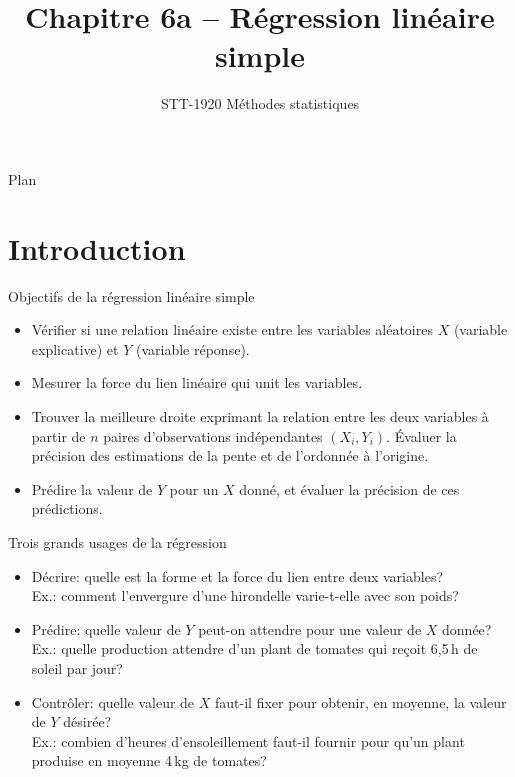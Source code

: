 \documentclass{BeamerTemplate}
\title{Chapitre 6a -- Régression linéaire simple}
\subtitle{STT-1920 Méthodes statistiques}
\date{}
\begin{document}
\begin{frame}[t]
  \titlepage
\end{frame}

\begin{frame}[t]{Plan}
\tableofcontents
\end{frame}

\section{Introduction}

\begin{frame}[t]{Objectifs de la régression linéaire simple}

\begin{itemize}\itemsep3mm
  \item Vérifier si une \alert{relation linéaire} existe entre les variables
  aléatoires $X$ (variable \alert{explicative}) et $Y$ (variable \alert{réponse}).
  \item<2-> Mesurer la \alert{force} du lien linéaire qui unit les variables.
  \item<3-> Trouver la \alert{meilleure droite} exprimant la relation entre les
  deux variables à partir de $n$ paires d'observations indépendantes $(X_i,Y_i)$.
  Évaluer la précision des estimations de la pente et de l'ordonnée à l'origine.
  \item<4-> \alert{Prédire} la valeur de $Y$ pour un $X$ donné, et évaluer la
  précision de ces prédictions.
\end{itemize}

\end{frame}

\begin{frame}[t]{Trois grands usages de la régression}

\begin{itemize}\itemsep4mm
  \item \alert{Décrire}: quelle est la forme et la force du lien entre deux
  variables?\\
  {\small Ex.: comment l'envergure d'une hirondelle varie-t-elle avec son poids?}
  \item<2-> \alert{Prédire}: quelle valeur de $Y$ peut-on attendre pour une valeur
  de $X$ donnée?\\
  {\small Ex.: quelle production attendre d'un plant de tomates qui reçoit 6,5\,h de
  soleil par jour?}
  \item<3-> \alert{Contrôler}: quelle valeur de $X$ faut-il fixer pour obtenir, en
  moyenne, la valeur de $Y$ désirée?\\
  {\small Ex.: combien d'heures d'ensoleillement faut-il fournir pour qu'un plant
  produise en moyenne 4\,kg de tomates?}
\end{itemize}

\end{frame}
\end{document}
